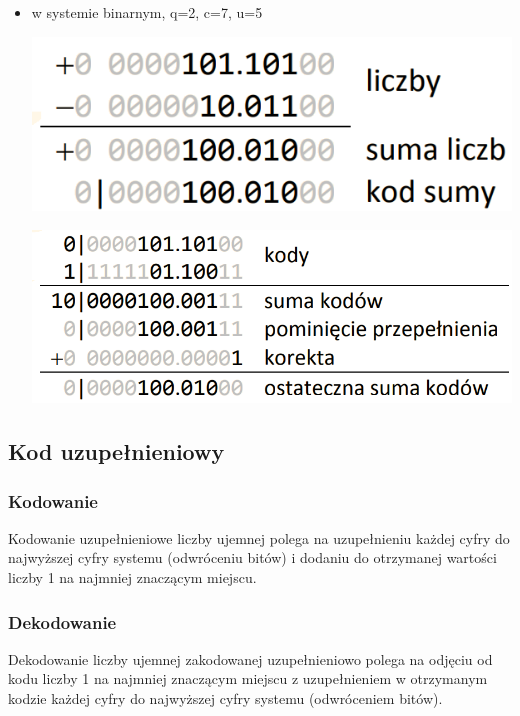 \documentclass[12pt]{article}
\begin{document}
\begin{itemize}
        \item w systemie binarnym, q=2, c=7, u=5
        \begin{center}
            \includegraphics[scale=0.4]{graphics/number-repr/odw-add-bin.png}
        \end{center}
        \begin{center}
            \includegraphics[scale=0.4]{graphics/number-repr/odw-add-bin-2.png}
        \end{center}

    \end{itemize}


    \subsection{Kod uzupełnieniowy}
    \subsubsection{Kodowanie}
    Kodowanie uzupełnieniowe liczby ujemnej polega na uzupełnieniu każdej cyfry do najwyższej
    cyfry systemu (odwróceniu bitów) i dodaniu do
    otrzymanej wartości liczby 1 na najmniej znaczącym miejscu.
    \subsubsection{Dekodowanie}
    Dekodowanie liczby ujemnej zakodowanej uzupełnieniowo polega na odjęciu od kodu liczby 1
    na najmniej znaczącym miejscu z uzupełnieniem
    w otrzymanym kodzie każdej cyfry do najwyższej
    cyfry systemu (odwróceniem bitów).
\end{document}
